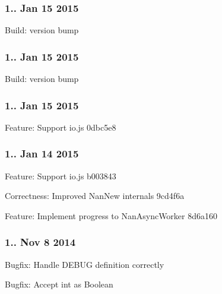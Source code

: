 \subsubsection*{1.. Jan 15 2015}


\begin{DoxyItemize}
\item Build\+: version bump
\end{DoxyItemize}

\subsubsection*{1.. Jan 15 2015}


\begin{DoxyItemize}
\item Build\+: version bump
\end{DoxyItemize}

\subsubsection*{1.. Jan 15 2015}


\begin{DoxyItemize}
\item Feature\+: Support io.\+js 0dbc5e8
\end{DoxyItemize}

\subsubsection*{1.. Jan 14 2015}


\begin{DoxyItemize}
\item Feature\+: Support io.\+js b003843
\item Correctness\+: Improved Nan\+New internals 9cd4f6a
\item Feature\+: Implement progress to Nan\+Async\+Worker 8d6a160
\end{DoxyItemize}

\subsubsection*{1.. Nov 8 2014}


\begin{DoxyItemize}
\item Bugfix\+: Handle D\+E\+B\+UG definition correctly
\item Bugfix\+: Accept int as Boolean
\end{DoxyItemize}

